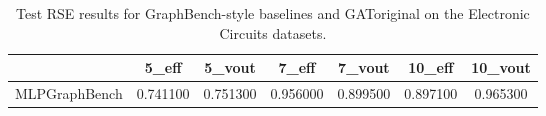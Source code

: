 \begin{table}
\caption{Test RSE results for GraphBench-style baselines and GAToriginal on the Electronic Circuits datasets.}
\label{tab:graphbench_results}
\begin{tabular}{lcccccc}
\toprule
 & 5_eff & 5_vout & 7_eff & 7_vout & 10_eff & 10_vout \\
\midrule
MLPGraphBench & 0.741100 & 0.751300 & 0.956000 & 0.899500 & 0.897100 & 0.965300 \\
\bottomrule
\end{tabular}
\end{table}
